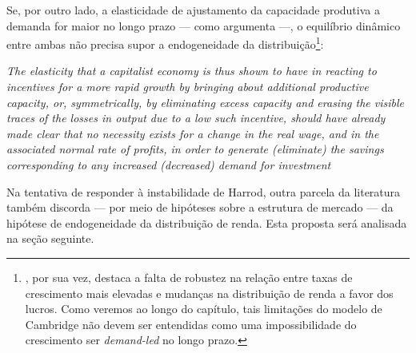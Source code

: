 Se, por outro lado, a elasticidade de ajustamento da capacidade produtiva a demanda for maior no longo prazo --- como argumenta \textcite[p.~62--3]{halevi_notes_2014} ---, o equilíbrio dinâmico entre ambas não precisa supor a endogeneidade da distribuição\footnote{\textcite[p.~158]{cesaratto_neo-kaleckian_2015}, por sua vez, destaca a falta de robustez na relação entre taxas de crescimento mais elevadas e mudanças na distribuição de renda a favor dos lucros.
	Como veremos ao longo do capítulo, tais limitações do modelo de Cambridge não devem ser entendidas como uma impossibilidade do crescimento ser \textit{demand-led} no longo prazo.}:

\begin{citacao}
	\textit{The elasticity that a capitalist economy is thus shown to have in
	reacting to incentives for a more rapid growth by bringing about
	additional productive capacity, or, symmetrically, by eliminating
	excess capacity and erasing the visible traces of the losses in output
	due to a low such incentive, should have already made clear that no
	necessity exists for a change in the real wage, and in the associated
	normal rate of profits, in order to generate (eliminate) the savings
	corresponding to any increased (decreased) demand for investment} \cite[p.~53]{halevi_notes_2014}
\end{citacao}
Na tentativa de responder à instabilidade de Harrod, outra parcela da literatura também discorda --- por meio de hipóteses sobre a estrutura de mercado --- da hipótese de endogeneidade da distribuição de renda.
Esta proposta será analisada na seção seguinte.

